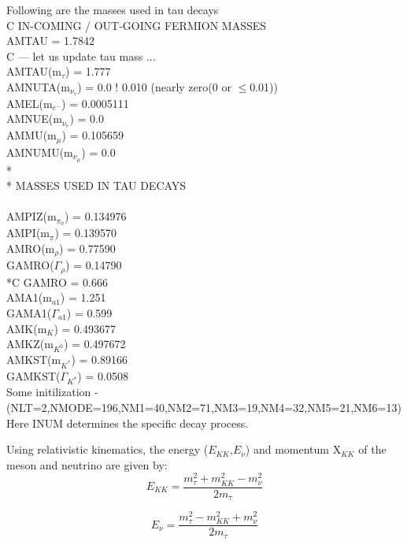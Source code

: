 \documentclass[12pt]{article}
\begin{document}
Following are the masses used in tau decays \\
C IN-COMING / OUT-GOING  FERMION MASSES\\
      AMTAU  = 1.7842\\
C --- let us update tau mass ...\\
      AMTAU(m$_\tau$)        = 1.777\\
      AMNUTA(m$_{\nu_\tau}$) = 0.0 $!$ 0.010   (nearly zero(0 or $\leq$0.01))\\
      AMEL(m$_{e^-}$)        = 0.0005111\\
      AMNUE(m$_{\nu_e}$)     = 0.0\\
      AMMU(m$_\mu$)          = 0.105659 \\
      AMNUMU(m$_{\nu_\mu}$)  = 0.0\\
*\\
* MASSES USED IN TAU DECAYS\\
\\
      AMPIZ(m$_{\pi_0}$)     = 0.134976\\
      AMPI(m$_\pi$)          = 0.139570\\
      AMRO(m$_\rho$)         = 0.77590\\
      GAMRO($\Gamma_\rho$)   = 0.14790\\
*C    GAMRO                  = 0.666\\
      AMA1(m$_{a1}$)         = 1.251\\
      GAMA1($\Gamma_{a1}$)   = 0.599\\
      AMK(m$_K$)             = 0.493677\\
      AMKZ(m$_{K^0}$)        = 0.497672\\
      AMKST(m$_{K^*}$)       = 0.89166\\
      GAMKST($\Gamma_{K^*}$) = 0.0508\\

Some initilization - \\

(NLT=2,NMODE=196,NM1=40,NM2=71,NM3=19,NM4=32,NM5=21,NM6=13)\\

Here INUM determines the specific decay process.

Using relativistic kinematics, the energy ($E_{KK}$,$E_\nu$) and momentum X$_{KK}$ of the meson and neutrino are given by:\\
\[E_{KK} = \frac{m_\tau^2+m_{KK}^2-m_\nu^2}{2m_\tau}\]

\[E_{\nu} = \frac{m_\tau^2-m_{KK}^2+m_\nu^2}{2m_\tau}\]
\end{document}
